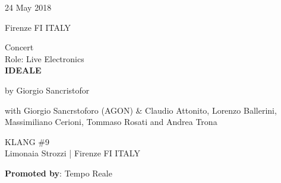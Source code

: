 \documentclass[7pt,a4paper]{article}
\begin{document}
\begin{mdframed}[
    backgroundcolor=entrygray,
    linecolor=entrygray,
    linewidth=0pt,
    innerleftmargin=6pt,
    innerrightmargin=6pt,
    innertopmargin=6pt,
    innerbottommargin=6pt,
    skipabove=0pt,
    skipbelow=0pt
]

\begin{minipage}[t]{0.28\textwidth}

24 May 2018

\scriptsize Firenze FI ITALY


\end{minipage}
\begin{minipage}[t]{0.68\textwidth}
\small Concert
\\\scriptsize Role: Live Electronics
\\ \normalsize \textbf{IDEALE}
\par\scriptsize by Giorgio Sancristofor
\par\scriptsize with Giorgio Sancrstoforo (AGON) \& Claudio Attonito, Lorenzo Ballerini, Massimiliano Cerioni, Tommaso Rosati and Andrea Trona
\vspace{0.25cm}



\small KLANG \#9\\Limonaia Strozzi | \scriptsize Firenze FI ITALY

\vspace{0.1cm}
\scriptsize

\vspace{0.1cm}
\par \textbf{Promoted by}: Tempo Reale
\end{minipage}
\vspace{0.25cm}
\end{mdframed}
\end{document}
